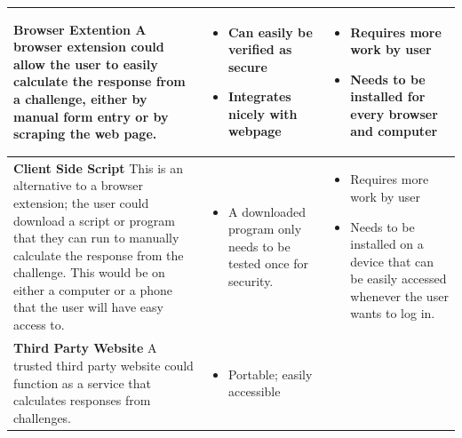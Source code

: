 \documentclass[11pt]{article}
\begin{document}
\begin{center}
\begin{tabular}{|  p{6cm} | p{5cm} | p{5cm} |}
    \\ \hline
    \vspace{.4cm}
    \textbf{Browser Extention}
    A browser extension could allow the user to easily calculate the response from a challenge, either by manual form entry or by scraping the web page.

    &
    \begin{itemize}[leftmargin=*]
    \item Can easily be verified as secure

    \item Integrates nicely with webpage
    \end{itemize}
    &
    \begin{itemize}[leftmargin=*]
    \item Requires more work by user

    \item Needs to be installed for every browser and computer
    \end{itemize}

    \\ \hline
    \vspace{.4cm}
    \textbf{Client Side Script}
    This is an alternative to a browser extension; the user could download a script or program that they can run to manually calculate the response from the challenge. This would be on either a computer or a phone that the user will have easy access to.

    &
    \begin{itemize}[leftmargin=*]
      \item A downloaded program only needs to be tested once for security.
    \end{itemize}

    &
    
    \begin{itemize}[leftmargin=*]
    \item Requires more work by user
    \item Needs to be installed on a device that can be easily accessed whenever the user wants to log in.
    \end{itemize}        

    \\ \hline
    \vspace{.4cm}
    \textbf{Third Party Website}
    A trusted third party website could function as a service that calculates responses from challenges.
    &

    \begin{itemize}[leftmargin=*]
      \item Portable; easily accessible
    \end{itemize}


\end{tabular}
\end{center}
\end{document}

